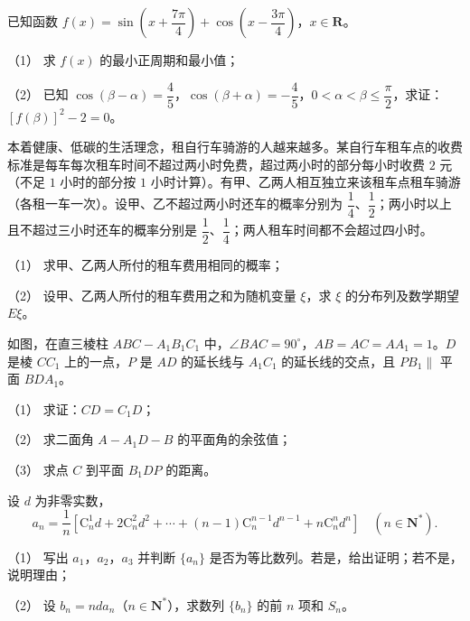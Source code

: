 \begin{question}
已知函数 $f(x)=\sin\left(x+\dfrac{7\pi}{4}\right)+\cos\left(x-\dfrac{3\pi}{4}\right)$，$x\in\mathbf R$。

（1） 求 $f(x)$ 的最小正周期和最小值；

（2） 已知 $\cos(\beta-\alpha)=\dfrac45$，$\cos(\beta+\alpha)=-\dfrac45$，$0<\alpha<\beta\leqslant\dfrac{\pi}{2}$，求证：$[f(\beta)]^2-2=0$。

\end{question}
\begin{question}
本着健康、低碳的生活理念，租自行车骑游的人越来越多。某自行车租车点的收费标准是每车每次租车时间不超过两小时免费，超过两小时的部分每小时收费 $2$ 元（不足 $1$ 小时的部分按 $1$ 小时计算）。有甲、乙两人相互独立来该租车点租车骑游（各租一车一次）。设甲、乙不超过两小时还车的概率分别为 $\dfrac14$、$\dfrac12$；两小时以上且不超过三小时还车的概率分别是 $\dfrac12$、$\dfrac14$；两人租车时间都不会超过四小时。

（1） 求甲、乙两人所付的租车费用相同的概率；

（2） 设甲、乙两人所付的租车费用之和为随机变量 $\xi$，求 $\xi$ 的分布列及数学期望 $E\xi$。

\Needspace{0.4\textheight}
\end{question}
\begin{question}
如图，在直三棱柱 $ABC-A_1B_1C_1$ 中，$\angle BAC=90^\circ$，$AB=AC=AA_1=1$。$D$ 是棱 $CC_1$ 上的一点，$P$ 是 $AD$ 的延长线与 $A_1C_1$ 的延长线的交点，且 $PB_1\parallel$ 平面 $BDA_1$。

（1） 求证：$CD=C_1D$；

（2） 求二面角 $A-A_1D-B$ 的平面角的余弦值；

（3） 求点 $C$ 到平面 $B_1DP$ 的距离。
\nopagebreak[4]
\begin{center}\end{center}
\nopagebreak[4]
\end{question}
\begin{question}
设 $d$ 为非零实数，
\nopagebreak[4]
\[a_n=\frac1n\left[\mathrm C_n^1d+2\mathrm C_n^2d^2+\cdots+(n-1)\mathrm C_n^{n-1}d^{n-1}+n\mathrm C_n^nd^n\right]\quad(n\in\mathbf N^*).\]

（1） 写出 $a_1$，$a_2$，$a_3$ 并判断 $\{a_n\}$ 是否为等比数列。若是，给出证明；若不是，说明理由；

（2） 设 $b_n=nda_n$（$n\in\mathbf N^*$），求数列 $\{b_n\}$ 的前 $n$ 项和 $S_n$。

\Needspace{0.4\textheight}
\end{question}

